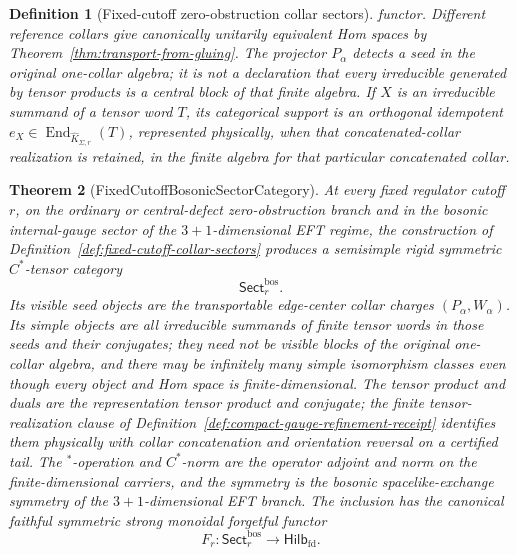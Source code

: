 \documentclass[11pt]{article}
\newtheorem{theorem}{Theorem}[section]
\newtheorem{definition}[theorem]{Definition}
\begin{document}
\begin{definition}[Fixed-cutoff zero-obstruction collar sectors]
functor. Different reference collars give canonically unitarily equivalent Hom spaces by
Theorem~\ref{thm:transport-from-gluing}. The projector \(P_\alpha\) detects a seed in the original
one-collar algebra; it is not a declaration that every irreducible generated by tensor products is
a central block of that finite algebra. If \(X\) is an irreducible summand of a tensor word
\(T\), its categorical support is an orthogonal idempotent
\(e_X\in\operatorname{End}_{\widehat K_{\Sigma,r}}(T)\), represented physically, when that
concatenated-collar realization is retained, in the finite algebra for that particular
concatenated collar.
\end{definition}

\begin{theorem}[FixedCutoffBosonicSectorCategory]\label{thm:fixed-cutoff-bosonic-sector-category}
At every fixed regulator cutoff \(r\), on the ordinary or central-defect zero-obstruction branch
and in the bosonic internal-gauge sector of the \(3+1\)-dimensional EFT regime, the construction of
Definition~\ref{def:fixed-cutoff-collar-sectors} produces a semisimple rigid symmetric
\(C^*\)-tensor category
\[
\mathsf{Sect}^{\mathrm{bos}}_r.
\]
Its visible seed objects are the transportable edge-center collar charges
\((P_\alpha,W_\alpha)\). Its simple objects are all irreducible summands of finite tensor words in
those seeds and their conjugates; they need not be visible blocks of the original one-collar
algebra, and there may be infinitely many simple isomorphism classes even though every object and
Hom space is finite-dimensional. The tensor product and duals are the representation tensor
product and conjugate; the finite tensor-realization clause of
Definition~\ref{def:compact-gauge-refinement-receipt} identifies them physically with collar
concatenation and orientation reversal on a certified tail. The \(^*\)-operation and \(C^*\)-norm are the operator
adjoint and norm on the finite-dimensional carriers, and the symmetry is the bosonic
spacelike-exchange symmetry of the \(3+1\)-dimensional EFT branch. The inclusion has the canonical
faithful symmetric strong monoidal forgetful functor
\[
F_r:\mathsf{Sect}^{\mathrm{bos}}_r\longrightarrow\mathsf{Hilb}_{\mathrm{fd}}.
\]
\end{theorem}
\end{document}
